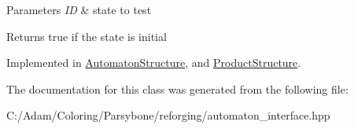 \begin{DoxyParams}{Parameters}
{\em I\-D} & state to test\\
\hline
\end{DoxyParams}
\begin{DoxyReturn}{Returns}
true if the state is initial 
\end{DoxyReturn}


Implemented in \hyperlink{class_automaton_structure_ac5aded68ef2f70ad78412b3e0e6cd6f2}{Automaton\-Structure}, and \hyperlink{class_product_structure_ab72b9e2ee9dc047e9ae20b7ea0057db2}{Product\-Structure}.



The documentation for this class was generated from the following file\-:\begin{DoxyCompactItemize}
\item 
C\-:/\-Adam/\-Coloring/\-Parsybone/reforging/automaton\-\_\-interface.\-hpp\end{DoxyCompactItemize}

